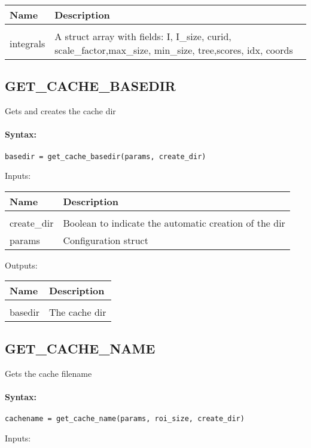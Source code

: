 \begin{tabular}{|l|p{5cm}|}
\hline
\textbf{Name} & \textbf{Description} \\
\hline \hline \\
integrals & A struct array with fields: I, I\_size, curid, scale\_factor,max\_size, min\_size, tree,scores, idx, coords  \\ \hline
\end{tabular}

\subsection{GET\_CACHE\_BASEDIR}

Gets and creates the cache dir

\paragraph{Syntax:} \verb|basedir = get_cache_basedir(params, create_dir)|

Inputs:

\begin{tabular}{|l|p{5cm}|}
\hline
\textbf{Name} & \textbf{Description} \\
\hline \hline \\
create\_dir & Boolean to indicate the automatic creation of the dir  \\ \hline
params & Configuration struct  \\ \hline
\end{tabular}
Outputs:

\begin{tabular}{|l|p{5cm}|}
\hline
\textbf{Name} & \textbf{Description} \\
\hline \hline \\
basedir & The cache dir  \\ \hline
\end{tabular}

\subsection{GET\_CACHE\_NAME}

Gets the cache filename

\paragraph{Syntax:} \verb|cachename = get_cache_name(params, roi_size, create_dir)|

Inputs:

